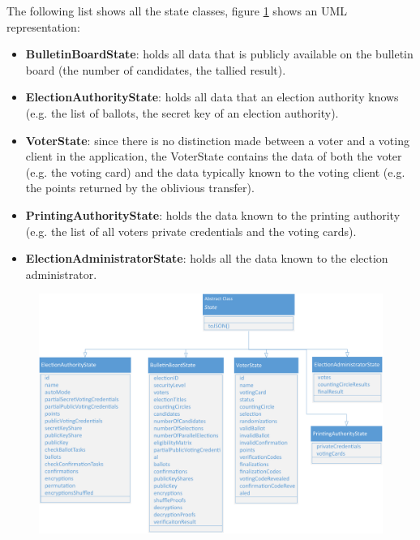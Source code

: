 The following list shows all the state classes, figure \ref{State classes} shows an UML representation:
\begin{itemize}
	\item \textbf{BulletinBoardState}: holds all data that is publicly available on the bulletin board (the number of candidates, the tallied result).
	\item \textbf{ElectionAuthorityState}: holds all data that an election authority knows (e.g. the list of ballots, the secret key of an election authority).
	\item \textbf{VoterState}: since there is no distinction made between a voter and a voting client in the application, the VoterState contains the data of both the voter (e.g. the voting card) and the data typically known to the voting client (e.g. the points returned by the oblivious transfer).
	\item \textbf{PrintingAuthorityState}: holds the data known to the printing authority (e.g. the list of all voters private credentials and the voting cards).
	\item \textbf{ElectionAdministratorState}: holds all the data known to the election administrator.
\end{itemize}
\begin{figure}
\begin{center}
\includegraphics[scale=0.60]{assets/uml_states.pdf}
\label{State classes}%
\end{center}
\end{figure}

